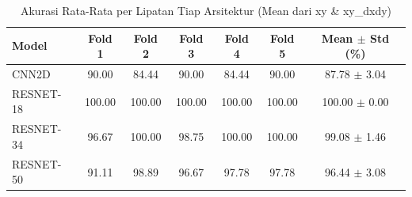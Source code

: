 \begin{table}[H]
  \centering
  \caption{Akurasi Rata-Rata per Lipatan Tiap Arsitektur (Mean dari xy \& xy\_dxdy)}
  \label{tab:fold-per-model}
  \begin{tabular}{|l|c|c|c|c|c|c|}
  \hline
  \textbf{Model} & \textbf{Fold 1} & \textbf{Fold 2} & \textbf{Fold 3} & \textbf{Fold 4} & \textbf{Fold 5} & \textbf{Mean $\pm$ Std (\%)} \\ \hline
CNN2D & 90.00 & 84.44 & 90.00 & 84.44 & 90.00 & 87.78 $\pm$ 3.04 \\ \hline
RESNET-18 & 100.00 & 100.00 & 100.00 & 100.00 & 100.00 & 100.00 $\pm$ 0.00 \\ \hline
RESNET-34 & 96.67 & 100.00 & 98.75 & 100.00 & 100.00 & 99.08 $\pm$ 1.46 \\ \hline
RESNET-50 & 91.11 & 98.89 & 96.67 & 97.78 & 97.78 & 96.44 $\pm$ 3.08 \\ \hline
  \end{tabular}
\end{table}